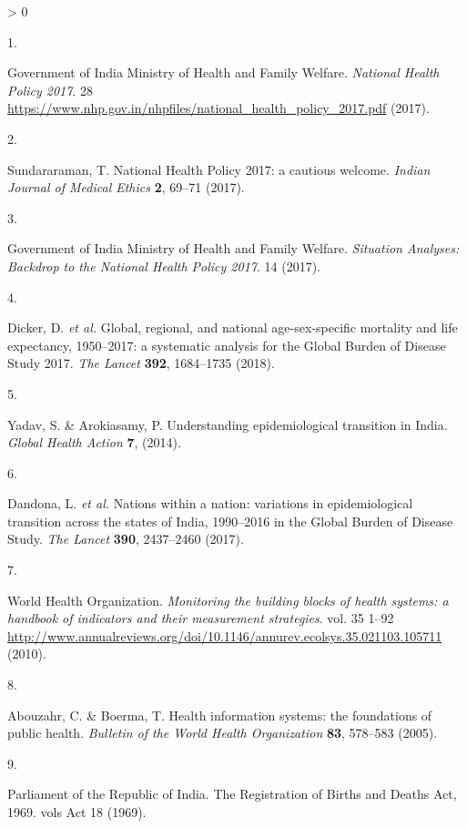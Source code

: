 \documentclass[
]{article}
\newlength{\cslhangindent}
\newlength{\csllabelwidth}
\newenvironment{CSLReferences}[2] %
 {%
  \setlength{\parindent}{0pt}
  \ifodd #1 \everypar{\setlength{\hangindent}{\cslhangindent}}\ignorespaces\fi
  \ifnum #2 > 0
  \setlength{\parskip}{#2\baselineskip}
  \fi
 }%
 {}
\newcommand{\CSLLeftMargin}[1]{\parbox[t]{\csllabelwidth}{#1}}
\newcommand{\CSLRightInline}[1]{\parbox[t]{\linewidth - \csllabelwidth}{#1}\break}
\begin{document}
\hypertarget{refs}{}
\begin{CSLReferences}{0}{0}
\leavevmode\hypertarget{ref-IND_MOHFW2017}{}%
\CSLLeftMargin{1. }
\CSLRightInline{Government of India Ministry of Health and Family Welfare. \emph{{National Health Policy 2017}}. 28 \url{https://www.nhp.gov.in/nhpfiles/national_health_policy_2017.pdf} (2017).}

\leavevmode\hypertarget{ref-Sundararaman2017}{}%
\CSLLeftMargin{2. }
\CSLRightInline{Sundararaman, T. {National Health Policy 2017: a cautious welcome}. \emph{Indian Journal of Medical Ethics} \textbf{2}, 69--71 (2017).}

\leavevmode\hypertarget{ref-IND_MOHFW2017a}{}%
\CSLLeftMargin{3. }
\CSLRightInline{Government of India Ministry of Health and Family Welfare. \emph{{Situation Analyses: Backdrop to the National Health Policy 2017}}. 14 (2017).}

\leavevmode\hypertarget{ref-Dicker2018}{}%
\CSLLeftMargin{4. }
\CSLRightInline{Dicker, D. \emph{et al.} {Global, regional, and national age-sex-specific mortality and life expectancy, 1950--2017: a systematic analysis for the Global Burden of Disease Study 2017}. \emph{The Lancet} \textbf{392}, 1684--1735 (2018).}

\leavevmode\hypertarget{ref-Yadav2014}{}%
\CSLLeftMargin{5. }
\CSLRightInline{Yadav, S. \& Arokiasamy, P. {Understanding epidemiological transition in India}. \emph{Global Health Action} \textbf{7}, (2014).}

\leavevmode\hypertarget{ref-Dandona2017}{}%
\CSLLeftMargin{6. }
\CSLRightInline{Dandona, L. \emph{et al.} {Nations within a nation: variations in epidemiological transition across the states of India, 1990--2016 in the Global Burden of Disease Study}. \emph{The Lancet} \textbf{390}, 2437--2460 (2017).}

\leavevmode\hypertarget{ref-WorldHealthOrganization2010}{}%
\CSLLeftMargin{7. }
\CSLRightInline{World Health Organization. \emph{{Monitoring the building blocks of health systems: a handbook of indicators and their measurement strategies}}. vol. 35 1--92 \url{http://www.annualreviews.org/doi/10.1146/annurev.ecolsys.35.021103.105711} (2010).}

\leavevmode\hypertarget{ref-Abouzahr2005}{}%
\CSLLeftMargin{8. }
\CSLRightInline{Abouzahr, C. \& Boerma, T. {Health information systems: the foundations of public health}. \emph{Bulletin of the World Health Organization} \textbf{83}, 578--583 (2005).}

\leavevmode\hypertarget{ref-ParliamentoftheRepublicofIndia1969}{}%
\CSLLeftMargin{9. }
\CSLRightInline{Parliament of the Republic of India. {The Registration of Births and Deaths Act, 1969}. vols Act 18 (1969).}


\end{CSLReferences}
\end{document}
